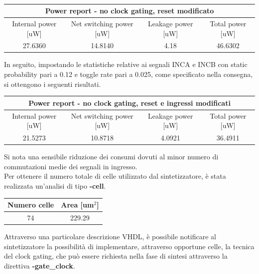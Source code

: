 \documentclass[11pt,  english, makeidx, a4paper, titlepage, oneside]{book}
\begin{document}
\\
\begin{center}
	\begin{tabular}{|c|c|c|c|}
	\hline
	\multicolumn{4}{|c|}{Power report - no clock gating, reset modificato}\\
	\hline
	Internal power [uW] & Net switching power [uW] & Leakage power [uW] & Total power [uW] \\
	\hline
	 27.6360 & 14.8140  & 4.18  &  46.6302 \\
	\hline
	\end{tabular}	
\end{center}
\vspace{0.3cm}
In seguito, impostando le statistiche relative ai segnali INCA e INCB con static probability pari a 0.12 e toggle rate pari a 0.025, come specificato nella consegna, si ottengono i seguenti risultati.
\\
\begin{center}
	\begin{tabular}{|c|c|c|c|}
	\hline
	\multicolumn{4}{|c|}{Power report - no clock gating, reset e ingressi modificati}\\
	\hline
	Internal power [uW] & Net switching power [uW] & Leakage power [uW] & Total power [uW] \\
	\hline
	21.5273 & 10.8718  & 4.0921  &  36.4911 \\
	\hline
	\end{tabular}	
\end{center}
\vspace{0.3cm}
Si nota una sensibile riduzione dei consumi dovuti al minor numero di commutazioni medie dei segnali in ingresso.\\
Per ottenere il numero totale di celle utilizzato dal sintetizzatore, è stata realizzata un'analisi di tipo \textbf{-cell}.
\\
\begin{center}
	\begin{tabular}{|c|c|}
	\hline
	Numero celle & Area [um$^2$] \\
	\hline
	 74 & 229.29 \\
	\hline
	\end{tabular}	
\end{center}
\vspace{0.3cm}
Attraverso una particolare descrizione VHDL, è possibile notificare al sintetizzatore la possibilità di implementare, attraverso opportune celle, la tecnica del clock gating, che può essere richiesta nella fase di sintesi attraverso la direttiva \textbf{-gate\_clock}.
\end{document}

